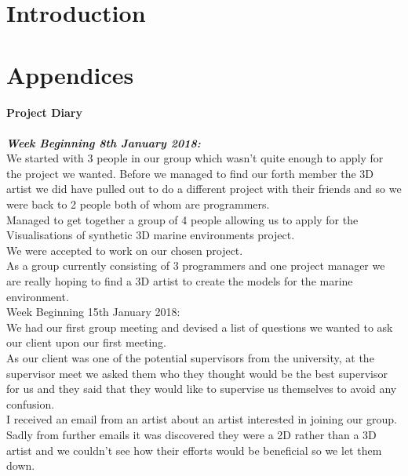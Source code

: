 \documentclass[10pt, a4paper]{article}
\title{\mytitle}
\author{\myauthor\hspace{1em}\\\contact\\Edinburgh Napier University\hspace{0.5em}-\hspace{0.5em}\mymodule}
\date{}
\begin{document}
	\maketitle
	\section{Introduction}
	
    
    \section{Appendices}
    \textbf{Project Diary}\\\\
    \textbf{\textit{Week Beginning 8th January 2018:}}\\
    We started with 3 people in our group which wasn't quite enough to apply for the project we wanted. Before we managed to find our forth member the 3D artist we did have pulled out to do a different project with their friends and so we were back to 2 people both of whom are programmers.\\
    
    Managed to get together a group of 4 people allowing us to apply for the Visualisations of synthetic 3D marine environments project.\\
    
    We were accepted to work on our chosen project.\\
    
    As a group currently consisting of 3 programmers and one project manager we are really hoping to find a 3D artist to create the models for the marine environment.\\
    
    Week Beginning 15th January 2018:\\
    We had our first group meeting and devised a list of questions we wanted to ask our client upon our first meeting.\\
    
    As our client was one of the potential supervisors from the university, at the supervisor meet we asked them who they thought would be the best supervisor for us and they said that they would like to supervise us themselves to avoid any confusion.\\
    
    I received an email from an artist about an artist interested in joining our group. Sadly from further emails it was discovered they were a 2D rather than a 3D artist and we couldn't see how their efforts would be beneficial so we let them down.\\
    
\end{document}

